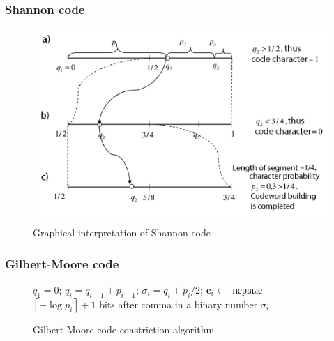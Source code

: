 \documentclass[14pt]{beamer}
\renewcommand{\vec}[1]{\ensuremath{\boldsymbol{#1}}}
\begin{document}
\begin{frame}
\frametitle{Shannon code}
\begin{itemize}    

\begin{figure}[ht]
\begin{minipage}{1.0\linewidth}
\includegraphics[width=1.0\textwidth]{fig2_7.png}
\caption{Graphical interpretation of Shannon code }
\label{Shan_graph}
\end{minipage}
\end{figure}

\end{itemize}
\end{frame}


\begin{frame}
\frametitle{Gilbert-Moore code}
\begin{itemize}    

    \begin{center}
    \begin{figure}
    \scalebox{0.75} {
    \begin{algorithm}[H]
    \dontprintsemicolon
      \BlankLine
      $q_{1}=0$;
      {
      $q_i=q_{i-1}+p_{i-1}$;
      $\sigma_i=q_i+p_i/2$;
      }
      \BlankLine
      {
      $\vec c_i\leftarrow $ первые
      $\left\lceil { - \log p_i } \right\rceil +1$ bits after comma in a binary number  $\sigma_i$.
      }
    \end{algorithm}
    }
    \caption{Gilbert-Moore code constriction algorithm}
    \label{alg_gm}
    \end{figure}
    \end{center}

\end{itemize}
\end{frame}
\end{document}
